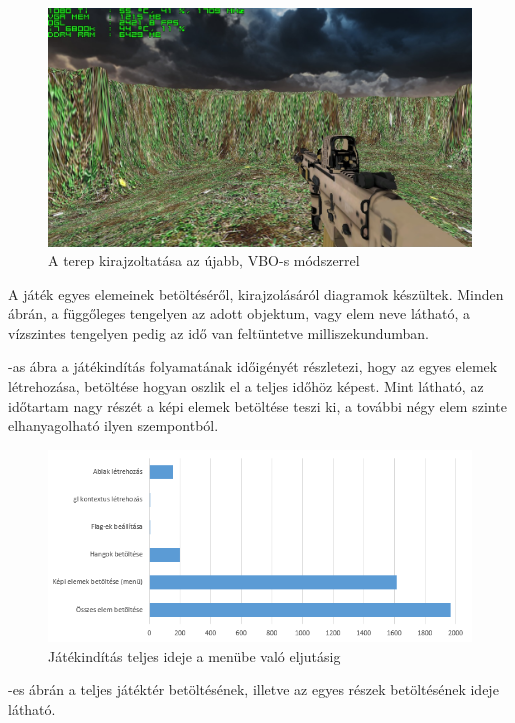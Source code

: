 \begin{figure}[h]
\centering
\includegraphics[scale=0.38]{kepek/vbo_method_fps.png}
\caption{A terep kirajzoltatása az újabb, VBO-s módszerrel}
\label{fig:vbo_fps}
\end{figure}


A játék egyes elemeinek betöltéséről, kirajzolásáról diagramok készültek. Minden ábrán, a függőleges tengelyen az adott objektum, vagy elem neve látható, a vízszintes tengelyen pedig az idő van feltüntetve milliszekundumban.

-as ábra a játékindítás folyamatának időigényét részletezi, hogy az egyes elemek létrehozása, betöltése hogyan oszlik el a teljes időhöz képest. Mint látható, az időtartam nagy részét a képi elemek betöltése teszi ki, a további négy elem szinte elhanyagolható ilyen szempontból.

\begin{figure}[h]
\centering
\includegraphics[scale=0.84]{kepek/start_diag.png}
\caption{Játékindítás teljes ideje a menübe való eljutásig}
\label{fig:start_diag}
\end{figure}

-es ábrán a teljes játéktér betöltésének, illetve az egyes részek betöltésének ideje látható.


